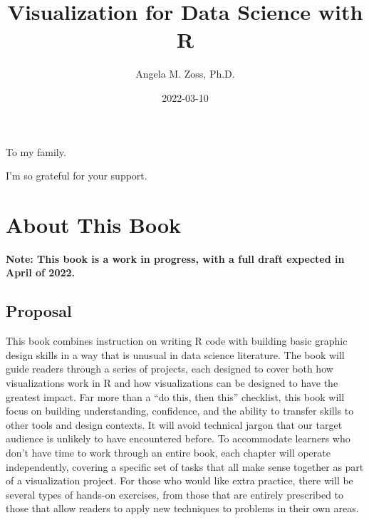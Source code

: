 \documentclass[
]{krantz}
\title{Visualization for Data Science with R}
\author{Angela M. Zoss, Ph.D.}
\date{2022-03-10}
\begin{document}
\maketitle


\thispagestyle{empty}

\begin{center}
To my family.

I'm so grateful for your support.
\end{center}

\setlength{\abovedisplayskip}{-5pt}
\setlength{\abovedisplayshortskip}{-5pt}

{
\hypersetup{linkcolor=}
\setcounter{tocdepth}{2}
\tableofcontents
}
\listoffigures
\listoftables
\hypertarget{about-this-book}{%
\chapter*{About This Book}\label{about-this-book}}


\textbf{Note: This book is a work in progress, with a full draft expected in April of 2022.}

\hypertarget{proposal}{%
\section*{Proposal}\label{proposal}}


This book combines instruction on writing R code with building basic graphic design skills in a way that is unusual in data science literature. The book will guide readers through a series of projects, each designed to cover both how visualizations work in R and how visualizations can be designed to have the greatest impact. Far more than a ``do this, then this'' checklist, this book will focus on building understanding, confidence, and the ability to transfer skills to other tools and design contexts. It will avoid technical jargon that our target audience is unlikely to have encountered before. To accommodate learners who don't have time to work through an entire book, each chapter will operate independently, covering a specific set of tasks that all make sense together as part of a visualization project. For those who would like extra practice, there will be several types of hands-on exercises, from those that are entirely prescribed to those that allow readers to apply new techniques to problems in their own areas.
\end{document}
